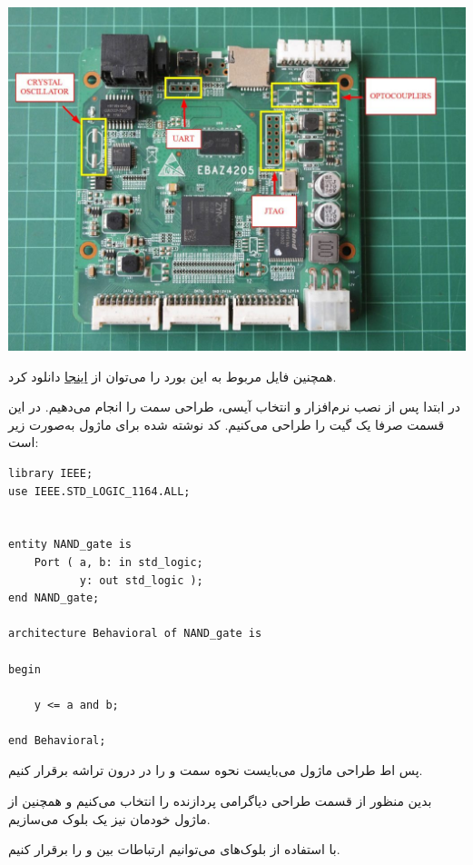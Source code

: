 \begin{center}
	\includegraphics*[width=0.7\linewidth]{pics/img2.jpg}
	\label{fig:EBAZ}
\end{center}

همچنین فایل  مربوط به این بورد را می‌توان از 
\href{https://github.com/xjtuecho/EBAZ4205/blob/master/Development/EBAZ4205.xdc}{اینجا}
دانلود کرد.


در ابتدا پس از نصب نرم‌افزار و انتخاب آیسی، طراحی سمت  را انجام می‌دهیم. در این قسمت صرفا یک گیت  را طراحی می‌کنیم. کد نوشته شده برای ماژول  به‌صورت زیر است:

\begin{latin}
\begin{lstlisting}[label=case_sens, caption=AND Module for PL]
library IEEE;
use IEEE.STD_LOGIC_1164.ALL;


entity NAND_gate is
	Port ( a, b: in std_logic;
		   y: out std_logic );
end NAND_gate;

architecture Behavioral of NAND_gate is

begin

	y <= a and b;

end Behavioral;

\end{lstlisting} 
\end{latin}

پس اط طراحی ماژول  می‌بایست نحوه  سمت  و  را در درون تراشه برقرار کنیم.

بدین منظور از قسمت طراحی دیاگرامی  پردازنده  را انتخاب می‌کنیم و همچنین از ماژول  خودمان نیز یک بلوک می‌سازیم. 

با استفاده از بلوک‌های \texttt{} می‌توانیم ارتباطات بین  و  را برقرار کنیم.


